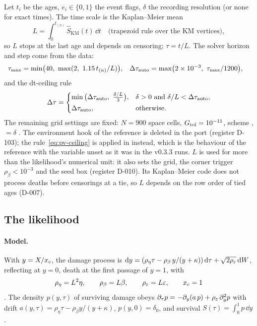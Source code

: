 Let $t_i$ be the ages, $e_i\in\{0,1\}$ the event flags, $\delta$ the recording resolution (or none for exact
times). The time scale is the Kaplan--Meier mean
\begin{equation}
  L=\int_0^{t_{(n)}}\hat S_{\mathrm{KM}}(t)\,\dd t \quad\text{(trapezoid rule over the KM vertices)},
\end{equation}
 so $L$ stops at the last age and depends on censoring; $\tau=t/L$.
The solver horizon and step come from the data:
\begin{align}
  \tau_{\max}&=\min\!\big(40,\ \max(2,\ 1.15\,t_{(n)}/L)\big), &
  \Delta\tau_{\rm auto}&=\max\!\big(2\times10^{-3},\ \tau_{\max}/1200\big),
  \label{eq:pv-autogrid}
\end{align}
 and the dt-ceiling rule 
\begin{equation}
  \Delta\tau=\begin{cases}\min\big(\Delta\tau_{\rm auto},\ \tfrac{\delta/L}{3}\big), & \delta>0\ \text{and}\ \delta/L<\Delta\tau_{\rm auto},\\[2pt]
  \Delta\tau_{\rm auto}, & \text{otherwise.}\end{cases}
  \label{eq:pv-ceiling}
\end{equation}
The remaining grid settings are fixed: $N=900$ space cells, $G_{\rm tol}=10^{-11}$, scheme ,
$=\delta$ . The environment hook
 of the reference  is deleted in the port (register D-103); the
rule~\eqref{eq:pv-ceiling} is applied in  instead, which is the behaviour of the reference
with the variable unset as it was in the v0.3.3 runs.
$L$ is used for more than the likelihood's numerical unit: it also sets the grid, the corner trigger
$\rho_\beta<10^{-3}$ and the seed box (register D-010). Its Kaplan--Meier code does not process deaths before
censorings at a tie, so $L$ depends on the row order of tied ages (D-007).

\subsection{The likelihood}\label{sec:pv-lik}

\paragraph{Model.} With $y=X/x_c$, the damage process is
$\mathrm{d} y=(\rho_\eta\tau-\rho_\beta\,y/(y+\kappa))\,\mathrm{d}\tau+\sqrt{2\rho_\varepsilon}\,\mathrm{d} W$, reflecting at $y=0$, death at
the first passage of $y=1$, with
\begin{equation}
  \rho_\eta=L^2\eta,\qquad \rho_\beta=L\beta,\qquad \rho_\varepsilon=L\varepsilon,\qquad x_c=1
  \label{eq:pv-groups}
\end{equation}
. The density $p(y,\tau)$ of surviving damage obeys
$\partial_\tau p=-\partial_y(a\,p)+\rho_\varepsilon\,\partial_y^2p$ with drift $a(y,\tau)=\rho_\eta\tau-\rho_\beta y/(y+\kappa)$,
$p(y,0)=\delta_0$, and survival $S(\tau)=\int_0^1p\,\dd y$.

